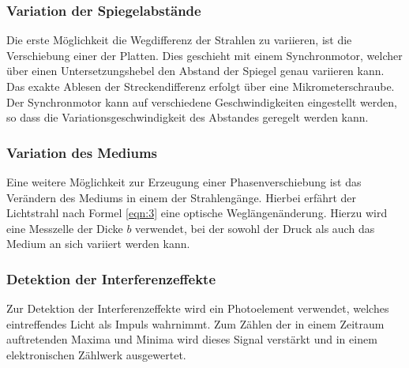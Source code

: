 \subsubsection{Variation der Spiegelabstände}
Die erste Möglichkeit die Wegdifferenz der Strahlen zu variieren, ist die Verschiebung einer der Platten.
Dies geschieht mit einem Synchronmotor, welcher über einen Untersetzungshebel den Abstand der Spiegel genau variieren kann.
Das exakte Ablesen der Streckendifferenz erfolgt über eine Mikrometerschraube.
Der Synchronmotor kann auf verschiedene Geschwindigkeiten eingestellt werden, so dass die Variationsgeschwindigkeit des Abstandes geregelt werden kann.

\subsubsection{Variation des Mediums}
Eine weitere Möglichkeit zur Erzeugung einer Phasenverschiebung ist das Verändern des Mediums in einem der Strahlengänge.
Hierbei erfährt der Lichtstrahl nach Formel \eqref{eqn:3} eine optische Weglängenänderung.
Hierzu wird eine Messzelle der Dicke $b$ verwendet, bei der sowohl der Druck als auch das Medium an sich variiert werden kann.

\subsubsection{Detektion der Interferenzeffekte}
Zur Detektion der Interferenzeffekte wird ein Photoelement verwendet, welches eintreffendes Licht als Impuls wahrnimmt.
Zum Zählen der in einem Zeitraum auftretenden Maxima und Minima wird dieses Signal verstärkt und in einem elektronischen Zählwerk ausgewertet.
